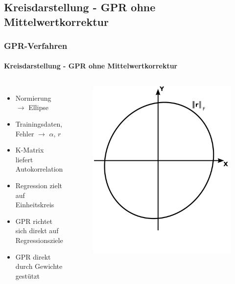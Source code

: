 \documentclass{beamer}
\begin{document}
\subsection{Kreisdarstellung - GPR ohne Mittelwertkorrektur}
\begin{frame}
\frametitle{GPR-Verfahren}
\framesubtitle{Kreisdarstellung - GPR ohne Mittelwertkorrektur}
\begin{columns}[c]
	\begin{itemize}
		\item<1-> Normierung $\rightarrow$ Ellipse
		\item<2-> Trainingsdaten, Fehler $\rightarrow$ $\alpha$, $r$
		\item<3-> K-Matrix liefert Autokorrelation
		\item<5-> Regression zielt auf Einheitskreis
		\item<6-> GPR richtet sich direkt auf Regressionsziele
		\item<6-> GPR direkt durch Gewichte gestützt
	\end{itemize}
	\begin{figure}
		\begin{overprint}
			\includegraphics[width=\linewidth]{images/GPR_Mapping_Zero_Mean-1}

\end{overprint}
\end{figure}
\end{columns}
\end{frame}
\end{document}
